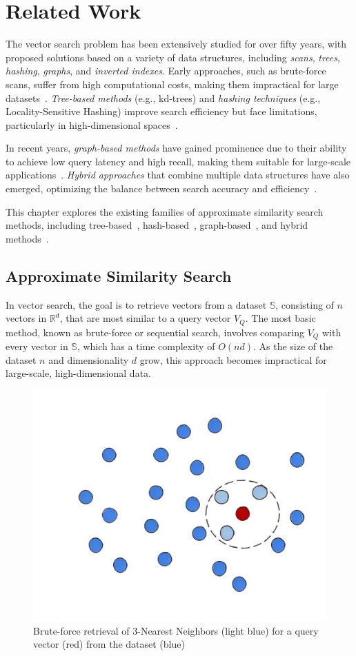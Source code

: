 \graphicspath{{../img/related/}}
\chapter{Related Work}
\label{chapter:related}
The vector search problem has been extensively studied for over fifty years, with proposed solutions based on a variety of data structures, including \textit{scans}, \textit{trees}, \textit{hashing}, \textit{graphs}, and \textit{inverted indexes}. Early approaches, such as brute-force scans, suffer from high computational costs, making them impractical for large datasets~\cite{vafile}. \textit{Tree-based methods} (e.g., kd-trees) and \textit{hashing techniques} (e.g., Locality-Sensitive Hashing) improve search efficiency but face limitations, particularly in high-dimensional spaces~\cite{dstree,isax2+,conf/stoc/indyk1998,qalsh}.

In recent years, \textit{graph-based methods} have gained prominence due to their ability to achieve low query latency and high recall, making them suitable for large-scale applications~\cite{hnsw,vamana,nsg}. \textit{Hybrid approaches} that combine multiple data structures have also emerged, optimizing the balance between search accuracy and efficiency~\cite{ieh,elpis}.

This chapter explores the existing families of approximate similarity search methods, including tree-based~\cite{dstree,isax2+,flann}, hash-based~\cite{conf/stoc/indyk1998,qalsh}, graph-based~\cite{hnsw,nsg,vamana}, and hybrid methods~\cite{ieh,elpis}. 
\clearpage

\section{Approximate Similarity Search}
\label{sec:related_works}

In vector search, the goal is to retrieve vectors from a dataset \(\mathbb{S}\), consisting of \(n\) vectors in \(\mathbb{R}^d\), that are most similar to a query vector \(V_Q\). The most basic method, known as brute-force or sequential search, involves comparing \(V_Q\) with every vector in \(\mathbb{S}\), which has a time complexity of \(O(nd)\). As the size of the dataset \(n\) and dimensionality \(d\) grow, this approach becomes impractical for large-scale, high-dimensional data.

\begin{figure}[ht] 
\centering
		\captionsetup{justification=centering}
		\includegraphics[width=0.5\columnwidth]{../img/related/knn.jpg}
		\caption{Brute-force retrieval of 3-Nearest Neighbors (light blue) for a query vector (red) from the dataset (blue)}        
		\label{fig:KNN_retrieval}
\end{figure}

